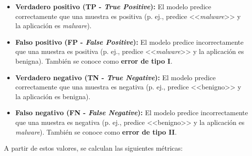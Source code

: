 \begin{itemize}
	\item \textbf{Verdadero positivo (TP - \textit{True Positive}):} El modelo predice correctamente que una muestra es positiva (p. ej., predice <<\textit{malware}>> y la aplicación es \textit{malware}).
	
	\item \textbf{Falso positivo (FP - \textit{False Positive}):} El modelo predice incorrectamente que una muestra es positiva (p. ej., predice <<\textit{malware}>> y la aplicación es benigna). También se conoce como \textbf{error de tipo I}.
	
	\item \textbf{Verdadero negativo (TN - \textit{True Negative}):} El modelo predice correctamente que una muestra es negativa (p. ej., predice <<benigno>> y la aplicación es benigna).
	
	\item \textbf{Falso negativo (FN - \textit{False Negative}):} El modelo predice incorrectamente que una muestra es negativa (p. ej., predice <<benigno>> y la aplicación es \textit{malware}). También se conoce como \textbf{error de tipo II}.
\end{itemize}

A partir de estos valores, se calculan las siguientes métricas:

